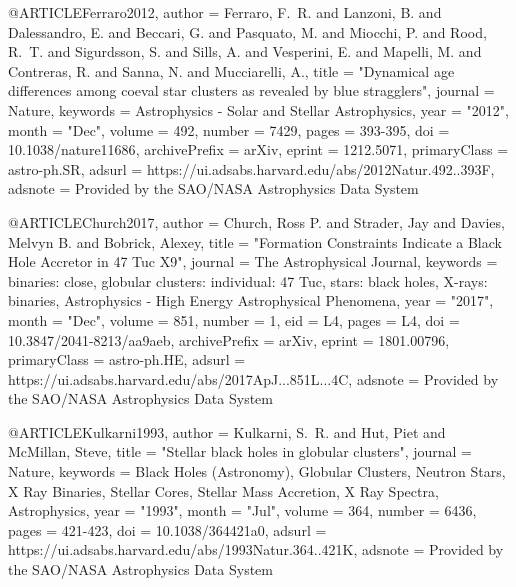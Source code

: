 \documentclass[twocolumn,tighten]{aastex63}
\begin{document}
@ARTICLE{Ferraro2012,
       author = {{Ferraro}, F.~R. and {Lanzoni}, B. and {Dalessandro}, E. and
         {Beccari}, G. and {Pasquato}, M. and {Miocchi}, P. and {Rood}, R.~T. and
         {Sigurdsson}, S. and {Sills}, A. and {Vesperini}, E. and {Mapelli}, M. and
         {Contreras}, R. and {Sanna}, N. and {Mucciarelli}, A.},
        title = "{Dynamical age differences among coeval star clusters as revealed by blue stragglers}",
      journal = {Nature},
     keywords = {Astrophysics - Solar and Stellar Astrophysics},
         year = "2012",
        month = "Dec",
       volume = {492},
       number = {7429},
        pages = {393-395},
          doi = {10.1038/nature11686},
archivePrefix = {arXiv},
       eprint = {1212.5071},
 primaryClass = {astro-ph.SR},
       adsurl = {https://ui.adsabs.harvard.edu/abs/2012Natur.492..393F},
      adsnote = {Provided by the SAO/NASA Astrophysics Data System}
}

@ARTICLE{Church2017,
       author = {{Church}, Ross P. and {Strader}, Jay and {Davies}, Melvyn B. and
         {Bobrick}, Alexey},
        title = "{Formation Constraints Indicate a Black Hole Accretor in 47 Tuc X9}",
      journal = {The Astrophysical Journal},
     keywords = {binaries: close, globular clusters: individual: 47 Tuc, stars: black holes, X-rays: binaries, Astrophysics - High Energy Astrophysical Phenomena},
         year = "2017",
        month = "Dec",
       volume = {851},
       number = {1},
          eid = {L4},
        pages = {L4},
          doi = {10.3847/2041-8213/aa9aeb},
archivePrefix = {arXiv},
       eprint = {1801.00796},
 primaryClass = {astro-ph.HE},
       adsurl = {https://ui.adsabs.harvard.edu/abs/2017ApJ...851L...4C},
      adsnote = {Provided by the SAO/NASA Astrophysics Data System}
}

@ARTICLE{Kulkarni1993,
       author = {{Kulkarni}, S.~R. and {Hut}, Piet and {McMillan}, Steve},
        title = "{Stellar black holes in globular clusters}",
      journal = {Nature},
     keywords = {Black Holes (Astronomy), Globular Clusters, Neutron Stars, X Ray Binaries, Stellar Cores, Stellar Mass Accretion, X Ray Spectra, Astrophysics},
         year = "1993",
        month = "Jul",
       volume = {364},
       number = {6436},
        pages = {421-423},
          doi = {10.1038/364421a0},
       adsurl = {https://ui.adsabs.harvard.edu/abs/1993Natur.364..421K},
      adsnote = {Provided by the SAO/NASA Astrophysics Data System}
}
\end{document}
